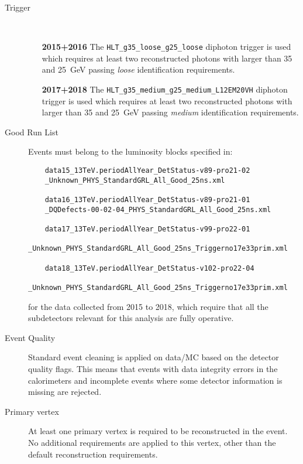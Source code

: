 \begin{description}
	
	\item[Trigger]~
	\begin{itemize}
		\item [\textbf{2015+2016}] The \texttt{HLT\_g35\_loose\_g25\_loose} diphoton trigger is used which requires at least two reconstructed photons with \ET larger than 35 and \SI{25}{\GeV} passing \emph{loose} identification requirements.
		
		\item [\textbf{2017+2018}] The \texttt{HLT\_g35\_medium\_g25\_medium\_L12EM20VH} diphoton trigger is used which requires at least two reconstructed photons with \ET larger than 35 and \SI{25}{\GeV} passing \emph{medium} identification requirements.
		
	\end{itemize}
	
	\item[Good Run List] Events must belong to the luminosity blocks specified in:
	\begin{verbatim}
	data15_13TeV.periodAllYear_DetStatus-v89-pro21-02
	_Unknown_PHYS_StandardGRL_All_Good_25ns.xml
	
	data16_13TeV.periodAllYear_DetStatus-v89-pro21-01
	_DQDefects-00-02-04_PHYS_StandardGRL_All_Good_25ns.xml
	
	data17_13TeV.periodAllYear_DetStatus-v99-pro22-01
	_Unknown_PHYS_StandardGRL_All_Good_25ns_Triggerno17e33prim.xml
	
	data18_13TeV.periodAllYear_DetStatus-v102-pro22-04
	_Unknown_PHYS_StandardGRL_All_Good_25ns_Triggerno17e33prim.xml
	\end{verbatim}
	for the data collected from 2015 to 2018, which require that all the subdetectors relevant for this analysis are fully operative.
	
	\item[Event Quality] Standard event cleaning is applied on data/MC based on the detector quality flags. This means that events with data integrity errors in the calorimeters and incomplete events where some detector information is missing are rejected.
	
	\item[Primary vertex] At least one primary vertex is required to be reconstructed in the event. No additional requirements are applied to this vertex, other than the default reconstruction requirements. 
	

\end{description}
